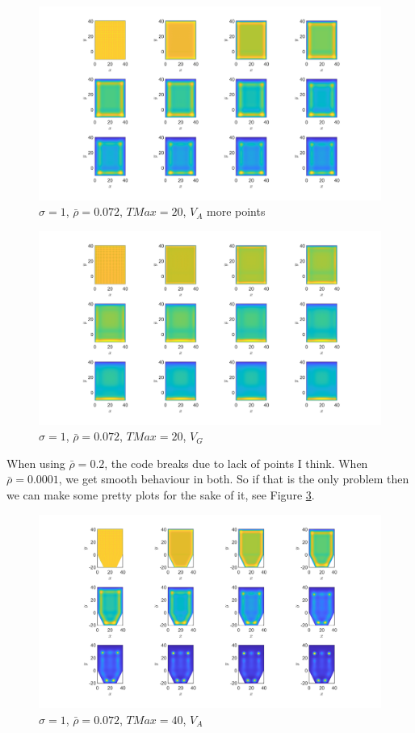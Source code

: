 \documentclass[11pt, a4paper]{article}
\theoremstyle{definition}
\begin{document}
\begin{figure}[h]
	\centering
	\includegraphics[scale=0.25]{MultiSolve1.png}
	\caption{$\sigma =1$, $\bar \rho =0.072$, $TMax = 20$, $V_A$ more points} 
	\label{F9b}
\end{figure}
\begin{figure}[h]
	\centering
	\includegraphics[scale=0.25]{Multi2.png}
	\caption{$\sigma =1$, $\bar \rho =0.072$, $TMax = 20$, $V_G$} 
	\label{F9}
\end{figure}
When using $\bar \rho = 0.2$, the code breaks due to lack of points I think. 
When $\bar \rho = 0.0001$, we get smooth behaviour in both.
So if that is the only problem then we can make some pretty plots for the sake of it, see Figure \ref{Fpp}.
\begin{figure}[h]
	\centering
	\includegraphics[scale=0.25]{PrettyPicture.png}
	\caption{$\sigma =1$, $\bar \rho =0.072$, $TMax = 40$, $V_A$} 
	\label{Fpp}
\end{figure}
\end{document}

